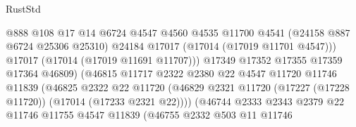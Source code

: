 \begin{lexlean}{RustStd}
\begin{coremodule}
                                          @888
                                          @108
                                          @17
                                          @14
                                          @6724
                                          @4547
                                          @4560
                                          @4535
                                          @11700
                                          @4541
                                          (@24158 @887 @6724 @25306 @25310)
                                          @24184
                                          @17017
                                          (@17014 (@17019 @11701 @4547)))
                                        @17017
                                        (@17014 (@17019 @11691 @11707)))
                                      @17349
                                      @17352
                                      @17355
                                      @17359
                                      @17364
                                      @46809)
                                    (@46815
                                      @11717
                                      @2322
                                      @2380
                                      @22
                                      @4547
                                      @11720
                                      @11746
                                      @11839
                                      (@46825
                                        @2322
                                        @22
                                        @11720
                                        (@46829
                                          @2321
                                          @11720
                                          (@17227 (@17228 @11720))
                                          (@17014 (@17233 @2321 @22))))
                                      (@46744
                                        @2333
                                        @2343
                                        @2379
                                        @22
                                        @11746
                                        @11755
                                        @4547
                                        @11839
                                        (@46755
                                          @2332
                                          @503
                                          @11
                                          @11746

\end{coremodule}
\end{lexlean}

